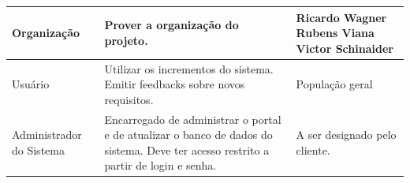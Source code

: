 \documentclass[12pt, a4paper]{article}
\begin{document}
\begin{longtabu}{X | X[2] | X[-1]}
                Organização &
                Prover a organização do projeto. &
                Ricardo Wagner \newline
                Rubens Viana \newline
                Victor Schinaider
                \\ \hline

                Usuário &
                Utilizar os incrementos do sistema. Emitir feedbacks sobre
                novos requisitos. &
                População geral
                \\ \hline
                
                Administrador do Sistema &
                Encarregado de administrar o portal e de atualizar o banco de dados do sistema. Deve ter acesso restrito a partir de login e senha.  &
                A ser designado pelo cliente.
                \\ \hline
            \end{longtabu}
            \newpage
\end{document}
